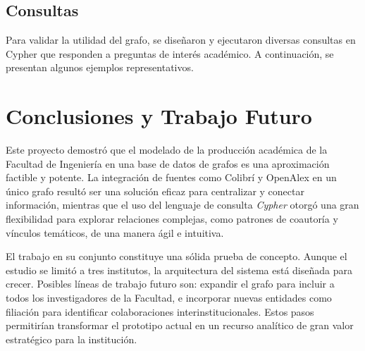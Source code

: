 \documentclass[journal]{IEEEtran}
\begin{document}
\subsection{Consultas}
Para validar la utilidad del grafo, se diseñaron y ejecutaron diversas consultas en Cypher que responden a preguntas de interés académico. A continuación, se presentan algunos ejemplos representativos.

\section{Conclusiones y Trabajo Futuro}
\label{conclusion}
Este proyecto demostró que el modelado de la producción académica de la Facultad de Ingeniería en una base de datos de grafos es una aproximación factible y potente. La integración de fuentes como Colibrí y OpenAlex en un único grafo resultó ser una solución eficaz para centralizar y conectar información, mientras que el uso del lenguaje de consulta \textit{Cypher} otorgó una gran flexibilidad para explorar relaciones complejas, como patrones de coautoría y vínculos temáticos, de una manera ágil e intuitiva.

El trabajo en su conjunto constituye una sólida prueba de concepto. Aunque el estudio se limitó a tres institutos, la arquitectura del sistema está diseñada para crecer. Posibles líneas de trabajo futuro son: expandir el grafo para incluir a todos los investigadores de la Facultad, e incorporar nuevas entidades como filiación para identificar colaboraciones interinstitucionales. Estos pasos permitirían transformar el prototipo actual en un recurso analítico de gran valor estratégico para la institución.

%


\end{document}
